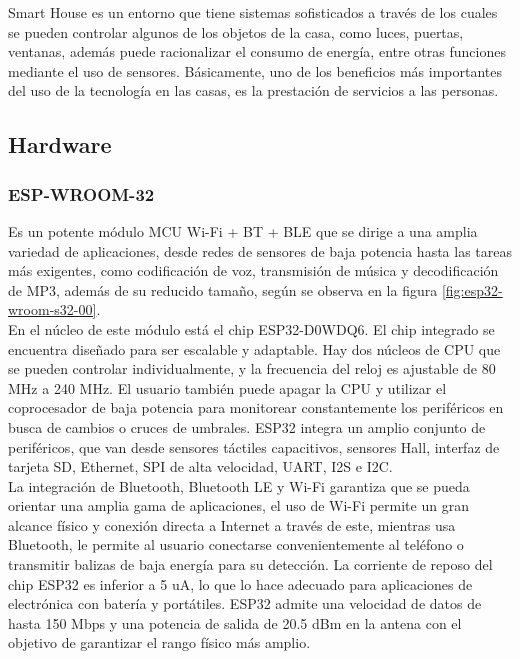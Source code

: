 Smart House es un entorno que tiene sistemas sofisticados a través de los cuales se pueden controlar algunos de los objetos de la casa, como luces, puertas, ventanas, además puede racionalizar el consumo de energía, entre otras funciones mediante el uso de sensores. Básicamente, uno de los beneficios más importantes del uso de la tecnología en las casas, es la prestación de servicios a las personas.\cite{Howedi2016} 

\subsection{Hardware}

\subsubsection{ESP-WROOM-32}

Es un potente módulo MCU Wi-Fi + BT + BLE que se dirige a una amplia variedad de aplicaciones, desde redes de sensores de baja potencia hasta las tareas más exigentes, como codificación de voz, transmisión de música y decodificación de MP3, además de su reducido tamaño, según se observa en la figura \ref{fig:esp32-wroom-s32-00}.\\

En el núcleo de este módulo está el chip ESP32-D0WDQ6. El chip integrado se encuentra diseñado para ser escalable y adaptable. Hay dos núcleos de CPU que se pueden controlar individualmente, y la frecuencia del reloj es ajustable de 80 MHz a 240 MHz. El usuario también puede apagar la CPU y utilizar el coprocesador de baja potencia para monitorear constantemente los periféricos en busca de cambios o cruces de umbrales. ESP32 integra un amplio conjunto de periféricos, que van desde sensores táctiles capacitivos, sensores Hall, interfaz de tarjeta SD, Ethernet, SPI de alta velocidad, UART, I2S e I2C.\\

La integración de Bluetooth, Bluetooth LE y Wi-Fi garantiza que se pueda orientar una amplia gama de aplicaciones, el uso de Wi-Fi permite un gran alcance físico y conexión directa a Internet a través de este, mientras usa Bluetooth, le permite al usuario conectarse convenientemente al teléfono o transmitir balizas de baja energía para su detección. La corriente de reposo del chip ESP32 es inferior a 5 uA, lo que lo hace adecuado para aplicaciones de electrónica con batería y portátiles. ESP32 admite una velocidad de datos de hasta 150 Mbps y una potencia de salida de 20.5 dBm en la antena con el objetivo de garantizar el rango físico más amplio.\\

